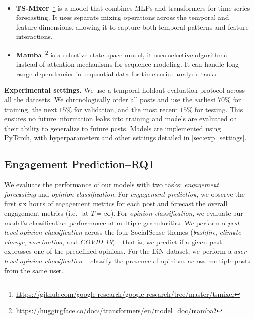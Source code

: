 \begin{itemize}[leftmargin=*]
    \item \textbf{TS-Mixer}~\cite{chen2023tsmixer}\footnote{\url{https://github.com/google-research/google-research/tree/master/tsmixer}} is a model that combines MLPs and transformers for time series forecasting. It uses separate mixing operations across the temporal and feature dimensions, allowing it to capture both temporal patterns and feature interactions.
    \item \textbf{Mamba}~\cite{mamba2}\footnote{\url{https://huggingface.co/docs/transformers/en/model_doc/mamba2}} is a selective state space model, it uses selective algorithms instead of attention mechanisms for sequence modeling. It can handle long-range dependencies in sequential data for time series analysis tasks.
\end{itemize}
\noindent\textbf{Experimental settings.}
We use a temporal holdout evaluation protocol across all the datasets.
We chronologically order all posts and use the earliest $70\%$ for training, the next $15\%$ for validation, and the most recent $15\%$ for testing. 
This ensures no future information leaks into training and models are evaluated on their ability to generalize to future posts.
Models are implemented using PyTorch, with hyperparameters and other settings detailed in \cref{sec:exp_settings}.



\subsection{Engagement Prediction--RQ1}
\label{subsec:results}

We evaluate the performance of our models with two tasks: \emph{engagement forecasting} and \emph{opinion classification}. 
For \emph{engagement prediction}, we observe the first six hours of engagement metrics for each post and forecast the overall engagement metrics (i.e.,\ at $T = \infty$). 
%
For \emph{opinion classification}, we evaluate our model's classification performance at multiple granularities.
We perform a \emph{post-level opinion classification} across the four SocialSense themes (\textit{bushfire}, \textit{climate change}, \textit{vaccination}, and \textit{COVID-19}) -- that is, we predict if a given post expresses one of the predefined opinions.
For the DiN dataset, we perform a \emph{user-level opinion classification} --
classify the presence of opinions across multiple posts from the same user.

